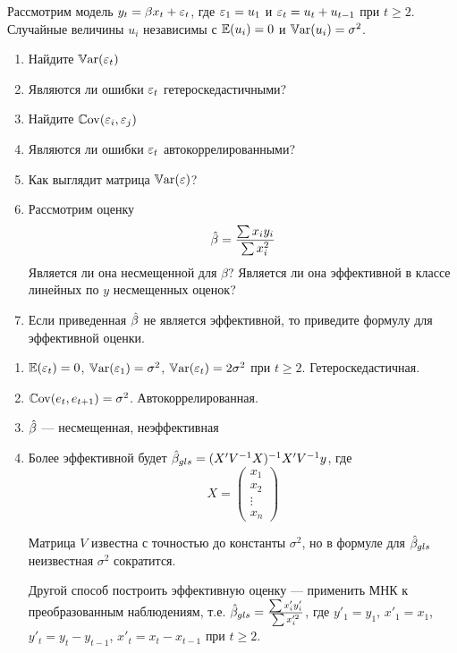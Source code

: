 \begin{problem}
Рассмотрим модель $y_t=\beta x_t +\varepsilon_t$, где $\varepsilon_1=u_1$ и $\varepsilon_t=u_t+u_{t-1}$ при $t\geq 2$. Случайные величины $u_i$ независимы с $\mathbb{E}(u_i)=0$ и $\mathbb{V}\mathrm{ar}(u_i)=\sigma^2$.
\begin{enumerate}
\item Найдите $\mathbb{V}\mathrm{ar}(\varepsilon_t)$
\item Являются ли ошибки $\varepsilon_t$ гетероскедастичными?
\item Найдите $\mathbb{C}\mathrm{ov}(\varepsilon_i,\varepsilon_j)$
\item Являются ли ошибки $\varepsilon_t$ автокоррелированными?
\item Как выглядит матрица $\mathbb{V}\mathrm{ar}(\varepsilon)$?
\item Рассмотрим оценку
\[
\hat{\beta}=\frac{\sum x_i y_i}{\sum x_i^2}
\]
Является ли она несмещенной для $\beta$? Является ли она эффективной в классе линейных по $y$ несмещенных оценок?
\item Если приведенная $\hat{\beta}$ не является эффективной, то приведите формулу для эффективной оценки.
\end{enumerate}



\begin{sol}
\begin{enumerate}
\item $\mathbb{E}(\varepsilon_t)=0$, $\mathbb{V}\mathrm{ar}(\varepsilon_1)=\sigma^2$, $\mathbb{V}\mathrm{ar}(\varepsilon_t)=2\sigma^2$ при $t\geq 2$.  Гетероскедастичная.
\item $\mathbb{C}\mathrm{ov}(e_t,e_{t+1})=\sigma^2$. Автокоррелированная.
\item $\hat{\beta}$ --- несмещенная, неэффективная
\item Более эффективной будет $\hat{\beta}_{gls}=(X'V^{-1}X)^{-1}X'V^{-1}y$, где
\[
X=\begin{pmatrix}
x_1 \\
x_2 \\
\vdots \\
x_n
\end{pmatrix}
\]

Матрица $V$ известна с точностью до константы $\sigma^2$, но в формуле для $\hat{\beta}_{gls}$ неизвестная $\sigma^2$ сократится.

Другой способ построить эффективную оценку --- применить МНК к преобразованным наблюдениям, т.е. $\hat{\beta}_{gls}=\frac{\sum x'_i y'_i}{\sum x_i^{\prime 2}}$, где $y'_1=y_1$, $x'_1=x_1$, $y'_t=y_t-y_{t-1}$, $x'_t=x_t-x_{t-1}$ при $t\geq 2$.
\end{enumerate}
\end{sol}
\end{problem}




